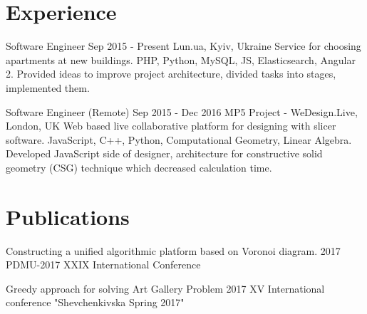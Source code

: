 \documentclass[letterpaper]{twentysecondcv} %
\begin{document}
\section{Experience}

\begin{twenty} %
	\twentyitemwithoutbegin
    	{}
        {Software Engineer}
        {Sep 2015 - Present}
        {Lun.ua, Kyiv, Ukraine}
        {Service for choosing apartments at new buildings.
        {PHP, Python, MySQL, JS, Elasticsearch, Angular 2. Provided ideas to improve project architecture, divided tasks into stages, implemented them.
        }
    }

    \twentyitemwithoutbegin
   	    {}
        {Software Engineer (Remote)}
        {Sep 2015 - Dec 2016 }
        {MP5 Project - WeDesign.Live, London, UK}
        {Web based live collaborative platform for designing with slicer software.
        {JavaScript, C++, Python, Computational Geometry, Linear Algebra. Developed JavaScript side of designer, architecture for constructive solid geometry (CSG) technique which decreased calculation time.
        }
        }
\end{twenty}
\section{Publications}
\begin{twenty}
	\twentyitemwithoutbegin
    	{}
        {Constructing a unified algorithmic platform based on Voronoi diagram.}
        {2017}
        {PDMU-2017 XXIX International Conference}
        {}
        \end{twenty}
\begin{twenty}
	\twentyitemwithoutbegin
    	{}
        {Greedy approach for solving Art Gallery Problem}
        {2017}
        {XV International conference "Shevchenkivska Spring 2017"}
        {}
\end{twenty}
\end{document}
